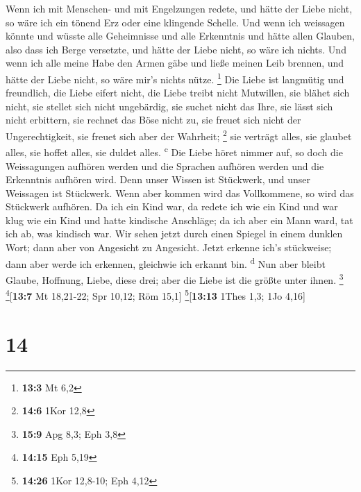  Wenn ich mit Menschen- und mit Engelzungen redete, und
hätte der Liebe nicht, so wäre ich ein tönend Erz oder eine klingende
Schelle.  Und wenn ich weissagen könnte und wüsste alle
Geheimnisse und alle Erkenntnis und hätte allen Glauben, also dass ich
Berge versetzte, und hätte der Liebe nicht, so wäre ich nichts.
 Und wenn ich alle meine Habe den Armen gäbe und ließe
meinen Leib brennen, und hätte der Liebe nicht, so wäre mir's nichts
nütze. \footnote{\textbf{13:3} Mt 6,2}  Die Liebe ist
langmütig und freundlich, die Liebe eifert nicht, die Liebe treibt nicht
Mutwillen, sie blähet sich nicht,  sie stellet sich nicht
ungebärdig, sie suchet nicht das Ihre, sie lässt sich nicht erbittern,
sie rechnet das Böse nicht zu,  sie freuet sich nicht der
Ungerechtigkeit, sie freuet sich aber der Wahrheit; \footnote{\textbf{14:6}
  1Kor 12,8}  sie verträgt alles, sie glaubet alles, sie
hoffet alles, sie duldet alles. \textsuperscript{c}  Die
Liebe höret nimmer auf, so doch die Weissagungen aufhören werden und die
Sprachen aufhören werden und die Erkenntnis aufhören wird.
 Denn unser Wissen ist Stückwerk, und unser Weissagen ist
Stückwerk.  Wenn aber kommen wird das Vollkommene, so
wird das Stückwerk aufhören.  Da ich ein Kind war, da
redete ich wie ein Kind und war klug wie ein Kind und hatte kindische
Anschläge; da ich aber ein Mann ward, tat ich ab, was kindisch war.
 Wir sehen jetzt durch einen Spiegel in einem dunklen
Wort; dann aber von Angesicht zu Angesicht. Jetzt erkenne ich's
stückweise; dann aber werde ich erkennen, gleichwie ich erkannt bin.
\textsuperscript{d}  Nun aber bleibt Glaube, Hoffnung,
Liebe, diese drei; aber die Liebe ist die größte unter ihnen.
\footnote{\textbf{15:9} Apg 8,3; Eph 3,8} \footnote{\textbf{14:15} Eph
  5,19}{[}\textbf{13:7} Mt 18,21-22; Spr 10,12; Röm 15,1{]}
\footnote{\textbf{14:26} 1Kor 12,8-10; Eph 4,12}{[}\textbf{13:13} 1Thes
1,3; 1Jo 4,16{]}

\hypertarget{section-13}{%
\section{14}\label{section-13}}


